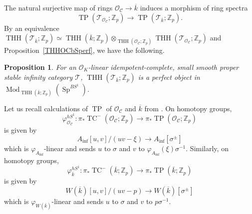 \documentclass[11pt]{amsart}
\newcommand{\Z}{\mathbb{Z}}
\newcommand{\sO}{\mathcal{O}}
\newcommand{\sT}{\mathcal{T}}
\newcommand{\Mod}{\operatorname{Mod}}
\newcommand{\THH}{\operatorname{THH}}
\newcommand{\TP}{\operatorname{TP}}
\newcommand{\TCn}{\operatorname{TC}^{-}}
\newcommand{\ol}{\overline}
\newcommand{\Ainf}{A_{\operatorname{inf}}}
\newcommand{\Cu}{\mathcal{C}}
\newcounter{spec}
\newcommand{\Sp}{\operatorname{Sp}}
\newtheorem{prop}[lemma]{Proposition}
\theoremstyle{definition}
\theoremstyle{remark}
\numberwithin{equation}{section}
\begin{document}
The natural surjective map of rings $\sO_\Cu \to \ol{k}$ induces a morphism of ring spectra
\begin{equation}\label{TPTPOColkmap}
\TP(\sT_{\sO_\Cu};\Z_p) \to \TP(\sT_{\ol{k}};\Z_p).
\end{equation}
By an equivalence $\THH(\sT_{\ol{k}};\Z_p)\simeq \THH(\ol{k};\Z_p) \otimes_{\THH(\sO_\Cu;\Z_p)} \THH(\sT_{\sO_\Cu};\Z_p)$ and Proposition~\ref{THHOCbSperf}, we have the following.
\begin{prop}\label{THHolkperf}
For an $\sO_K$-linear idempotent-complete, small smooth proper stable infinity category $\sT$, $\THH(\sT_{\ol{k}};\Z_p)$ is a perfect object in $\Mod_{\THH({\ol{k}};\Z_p)}(\Sp^{BS^1})$.
\end{prop}

Let us recall calculations of $\TP$ of $\sO_\Cu$ and $\ol{k}$ from \cite{BMS2}. On homotopy groups,
\begin{equation}
\varphi^{hS^1}_{\sO_\Cu}:  \pi_* \TCn(\sO_\Cu;\Z_p) \to \pi_*\TP(\sO_\Cu;\Z_p)
\end{equation}
is given by 
\[
\Ainf[u,v]/(uv-\xi) \to \Ainf[\sigma^\pm]
\]
which is $\varphi_{\Ainf}$-linear and sends $u$ to $\sigma$ and $v$ to $\varphi_{\Ainf}(\xi)\sigma^{-1}$. Similarly, on homotopy groups,
\begin{equation}
\varphi^{hS^1}_{\ol{k}}: \pi_* \TCn(\ol{k};\Z_p) \to \pi_*\TP(\ol{k};\Z_p)
\end{equation}
is given by 
\[
W(\ol{k})[u,v]/(uv-p) \to W(\ol{k})[\sigma^\pm]
\]
which is $\varphi_{W(\ol{k})}$-linear and sends $u$ to $\sigma$ and $v$ to $p\sigma^{-1}$.
\end{document}
